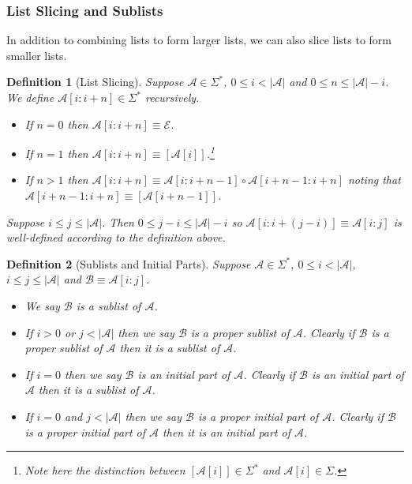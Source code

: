 \documentclass[12pt]{article}
\theoremstyle{break}
\newtheorem{definition}{Definition}[section]
\theoremstyle{break}
\theoremstyle{break}
\theoremstyle{break}
\theoremstyle{break}
\newtheorem{informal definition}[definition]{Informal Definition}
\newcommand{\mc}[1]{\mathcal{#1}}
\begin{document}
\subsubsection{List Slicing and Sublists}
In addition to combining lists to form larger lists, we can also slice lists to form smaller lists.

\begin{definition}[List Slicing]
Suppose $\mc{A} \in \Sigma^*$, $0\le i < |\mc{A}|$ and $0 \le n \le |\mc{A}| - i$.
We define $\mc{A}[i:i+n]\in\Sigma^*$ recursively.

\begin{itemize}
\item{If $n=0$ then $\mc{A}[i:i+n] \equiv \mc{E}$.}
\item{If $n=1$ then $\mc{A}[i:i+n] \equiv [\mc{A}[i]]$.\footnote{Note here the distinction between $[\mc{A}[i]]\in\Sigma^*$ and $\mc{A}[i]\in\Sigma$.}}
\item{If $n>1$ then $\mc{A}[i:i+n] \equiv \mc{A}[i:i+n-1] \circ \mc{A}[i+n-1:i+n]$ noting that $\mc{A}[i+n-1:i+n] \equiv [\mc{A}[i+n-1]]$.}
\end{itemize}

Suppose $i \le j \le |\mc{A}|$.
Then $0 \le j-i \le |\mc{A}|-i$ so $\mc{A}[i:i+(j-i)] \equiv \mc{A}[i:j]$ is well-defined according to the definition above.


\end{definition}

\begin{definition}[Sublists and Initial Parts]
Suppose $\mc{A}\in\Sigma^*$, $0\le i < |\mc{A}|$, $i\le j \le |\mc{A}|$ and $\mc{B} \equiv \mc{A}[i:j]$.
\begin{itemize}
\item{We say $\mc{B}$ is a sublist of $\mc{A}$.}
\item{If $i>0$ or $j<|\mc{A}|$ then we say $\mc{B}$ is a proper sublist of $\mc{A}$. Clearly if $\mc{B}$ is a proper sublist of $\mc{A}$ then it is a sublist of $\mc{A}$.}
\item{If $i=0$ then we say $\mc{B}$ is an initial part of $\mc{A}$. Clearly if $\mc{B}$ is an initial part of $\mc{A}$ then it is a sublist of $\mc{A}$.}
\item{If $i=0$ and $j < |\mc{A}|$ then we say $\mc{B}$ is a proper initial part of $\mc{A}$. Clearly if $\mc{B}$ is a proper initial part of $\mc{A}$ then it is an initial part of $\mc{A}$.}
\end{itemize}
\end{definition}
\end{document}
